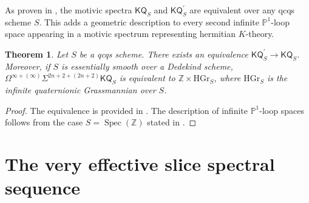 \documentclass[11pt,hyp,english]{article}
\newcommand{\Z}{\mathbb{Z}}
\renewcommand{\P}{\mathbb{P}}
\newcommand{\KQ}{\mathsf{KQ}}
\newcommand{\Spec}{\operatorname{Spec}}
\newtheorem{theorem}{Theorem}[section]
\theoremstyle{definition}
\begin{document}
As proven in \cite{kr.comparison}, the motivic spectra $\KQ_S$ and $\KQ_S^\prime$ are equivalent over any qcqs scheme $S$.
This adds a geometric description to every second infinite $\P^1$-loop space appearing in a 
motivic spectrum representing hermitian $K$-theory.

\begin{theorem}\label{thm:chn-kumar}
Let $S$ be a qcqs scheme.
There exists an equivalence $\KQ_S^\prime \to \KQ_S$.
Moreover, if $S$ is essentially smooth over a Dedekind scheme, $\Omega^{\infty+(\infty)}\Sigma^{2n+2+(2n+2)}\KQ_S$ is equivalent to $\Z\times \mathrm{HGr}_S$, 
where $\mathrm{HGr}_S$ is the infinite quaternionic Grassmannian over $S$.
\end{theorem}

\begin{proof}
    The equivalence is provided in \cite[Theorem 2.3]{kr.comparison}.
    The description of infinite $\P^1$-loop spaces follows from the case $S=\Spec(\Z)$ stated in \cite[Lemma 2.4]{kr.comparison}.
\end{proof}
    
\section{The very effective slice spectral sequence}
\label{section:tvesss}
\end{document}
